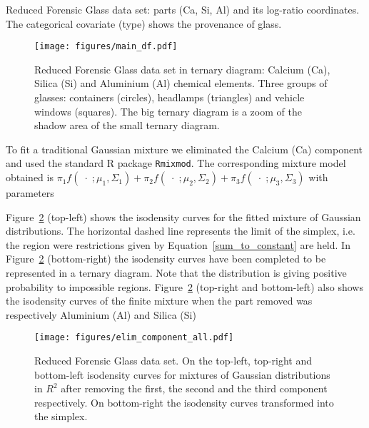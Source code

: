 \documentclass[12pt, a4paper]{article}
\begin{document}
\begin{table}
\centering
\scriptsize


%
\caption{Reduced Forensic Glass data set: parts (Ca, Si, Al) and its log-ratio coordinates. 
The categorical covariate  (type) shows the provenance of glass.}
\label{example_glasses}
\end{table}

% 
% 

\begin{figure}[htbp]
\centering
\texttt{[image: figures/main\_df.pdf]}%
\caption{Reduced Forensic Glass data set in ternary diagram: Calcium (Ca), Silica (Si) and Aluminium (Al) chemical elements. Three groups of glasses: containers (circles), headlamps (triangles) and vehicle windows (squares). The big ternary diagram is a zoom of the shadow area of the small ternary diagram.}
\label{fig04}
\end{figure}


To fit a traditional Gaussian mixture we eliminated the Calcium (Ca) component and used the standard R package \texttt{Rmixmod}. The corresponding mixture model obtained is
$
\pi_1 f(\;\cdot\; ; \mu_1, \Sigma_1) + \pi_2 f(\;\cdot\; ; \mu_2, \Sigma_2) + \pi_3 f(\;\cdot\; ; \mu_3, \Sigma_3)
$
with parameters

{\small  }


Figure~\ref{fig05component_elimination} (top-left) shows the isodensity curves for the fitted mixture of Gaussian distributions. The horizontal dashed line represents the limit of the simplex, i.e. the region were restrictions given by Equation~\ref{sum_to_constant} are held. In Figure~\ref{fig05component_elimination} (bottom-right) the isodensity curves have been completed to be represented in a ternary diagram. Note that the distribution is giving positive probability to impossible regions. Figure~\ref{fig05component_elimination} (top-right and bottom-left) also shows the isodensity curves of the finite mixture when the part removed was respectively Aluminium (Al) and Silica (Si)

\begin{figure}[htbp]
\texttt{[image: figures/elim\_component\_all.pdf]}
\caption{Reduced Forensic Glass data set. On the top-left, top-right and bottom-left isodensity curves for mixtures of Gaussian distributions in $R^{2}$ after removing the first, the second and the third component respectively. On bottom-right the isodensity curves transformed into the simplex.}
\label{fig05component_elimination}
\end{figure}
\end{document}

